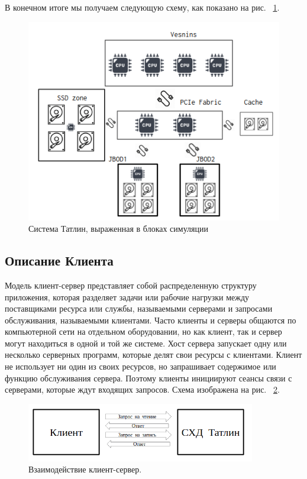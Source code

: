 В конечном итоге мы получаем следующую схему, как показано на рис. ~\ref{fig:simtatlin}.
\begin{figure}[!ht]
\centering
\includegraphics[width=\textwidth]{Kenenbek/images/t-scheme.png}
\caption{Система Татлин, выраженная в блоках симуляции}
\label{fig:simtatlin}
\end{figure}


\subsection{Описание Клиента}
\par 
Модель клиент-сервер представляет собой распределенную структуру приложения, которая разделяет задачи или рабочие нагрузки между поставщиками ресурса или службы, называемыми серверами и запросами обслуживания, называемыми клиентами. Часто клиенты и серверы общаются по компьютерной сети на отдельном оборудовании, но как клиент, так и сервер могут находиться в одной и той же системе. Хост сервера запускает одну или несколько серверных программ, которые делят свои ресурсы с клиентами. Клиент не использует ни один из своих ресурсов, но запрашивает содержимое или функцию обслуживания сервера. Поэтому клиенты инициируют сеансы связи с серверами, которые ждут входящих запросов. Схема изображена на рис. ~\ref{fig:client}.

\begin{figure}[!ht]
\centering
\includegraphics[width=10cm]{Kenenbek/images/client.png}
\caption{Взаимодействие клиент-сервер.}
\label{fig:client}
\end{figure}

